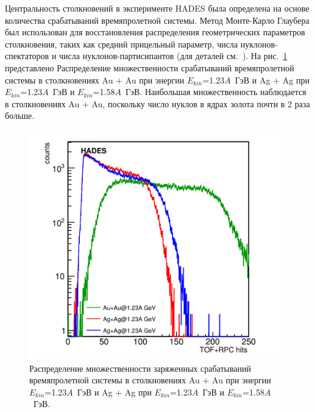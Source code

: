 Центральность столкновений в эксперименте HADES была определена на основе количества срабатываний времяпролетной системы.
Метод Монте-Карло Глаубера был использован для восстановления распределения геометрических параметров столкновения, таких как средний прицельный параметр, числа нуклонов-спектаторов и числа нуклонов-партисипантов (для деталей см.~\cite{HADES:2017def}).
На рис.~\ref{fig:hades_multiplicity} представлено Распределение множественности срабатываний времяпролетной системы в столкновениях Au + Au при энергии $E_{kin}$=1.23$A$~ГэВ и Ag + Ag при $E_{kin}$=1.23$A$~ГэВ и $E_{kin}$=1.58$A$~ГэВ.
Наибольшая множественность наблюдается в столкновениях Au + Au, поскольку число нуклов в ядрах золота почти в 2 раза больше.
\begin{figure}[ht]
\begin{center}
    \includegraphics[width=0.55\linewidth]{images/multiplicity.png}
    \caption{Распределение множественности заряженных срабатываний времяпролетной системы в столкновениях Au + Au при энергии $E_{kin}$=1.23$A$~ГэВ и Ag + Ag при $E_{kin}$=1.23$A$~ГэВ и $E_{kin}$=1.58$A$~ГэВ.
    }
    \label{fig:hades_multiplicity}
\end{center}
\end{figure}

